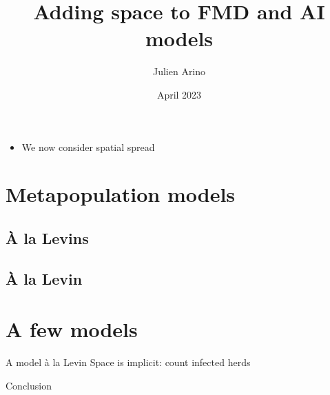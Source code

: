 \documentclass[aspectratio=43]{beamer}
\title{Adding space to FMD and AI models}
\author{Julien Arino}
\date{April 2023}
\begin{document}

\begin{frame}
  \titlepage
\end{frame}
\addtocounter{page}{-1}


\begin{frame}
\begin{itemize}
  \item We now consider spatial spread
\end{itemize}
\end{frame}


\section{Metapopulation models}

\subsection{\`A la Levins}
\subsection{\`A la Levin}


\section{A few models}


\begin{frame}{A model \`a la Levin}
    Space is implicit: count infected herds
\end{frame}



\begin{frame}{Conclusion}
\end{frame}
\end{document}
